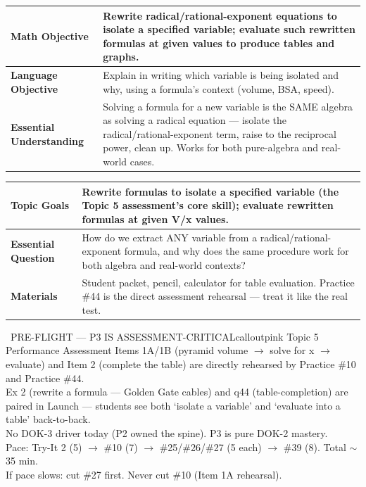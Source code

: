 \documentclass[11pt]{article}
\newcommand{\lessonrow}[2]{\textbf{#1} & #2 \\ \hline}
\begin{document}

{\small
\renewcommand{\arraystretch}{1.25}
\noindent\begin{tabular}{|p{1.8in}|p{4.8in}|}
\hline
\lessonrow{Math Objective}{Rewrite radical/rational-exponent equations to isolate a specified variable; evaluate such rewritten formulas at given values to produce tables and graphs.}
\lessonrow{Language Objective}{Explain in writing which variable is being isolated and why, using a formula's context (volume, BSA, speed).}
\lessonrow{Essential Understanding}{Solving a formula for a new variable is the SAME algebra as solving a radical equation --- isolate the radical/rational-exponent term, raise to the reciprocal power, clean up. Works for both pure-algebra and real-world cases.}
\end{tabular}
}

{\small
\renewcommand{\arraystretch}{1.25}
\noindent\begin{tabular}{|p{1.8in}|p{4.8in}|}
\hline
\lessonrow{Topic Goals}{Rewrite formulas to isolate a specified variable (the Topic 5 assessment's core skill); evaluate rewritten formulas at given V/x values.}
\lessonrow{Essential Question}{How do we extract ANY variable from a radical/rational-exponent formula, and why does the same procedure work for both algebra and real-world contexts?}
\lessonrow{Materials}{Student packet, pencil, calculator for table evaluation. Practice \#44 is the direct assessment rehearsal --- treat it like the real test.}
\end{tabular}
}

\begin{callout}{\IconPin\ PRE-FLIGHT --- P3 IS ASSESSMENT-CRITICAL}{calloutpink}
Topic 5 Performance Assessment Items 1A/1B (pyramid volume \(\rightarrow\) solve for x \(\rightarrow\) evaluate) and Item 2 (complete the table) are directly rehearsed by Practice \#10 and Practice \#44.\\
Ex 2 (rewrite a formula --- Golden Gate cables) and q44 (table-completion) are paired in Launch --- students see both `isolate a variable' and `evaluate into a table' back-to-back.\\
No DOK-3 driver today (P2 owned the spine). P3 is pure DOK-2 mastery.\\
Pace: Try-It 2 (5) \(\rightarrow\) \#10 (7) \(\rightarrow\) \#25/\#26/\#27 (5 each) \(\rightarrow\) \#39 (8). Total \(\sim\)35 min.\\
If pace slows: cut \#27 first. Never cut \#10 (Item 1A rehearsal).
\end{callout}
\end{document}
